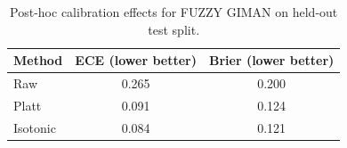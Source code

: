 \begin{table}[t]
\centering
\caption{Post-hoc calibration effects for FUZZY GIMAN on held-out test split.}
\label{tab:calibration}
\begin{tabular}{lcc}
\toprule
Method & ECE (lower better) & Brier (lower better) \\
\midrule
Raw & 0.265 & 0.200 \\
Platt & 0.091 & 0.124 \\
Isotonic & 0.084 & 0.121 \\
\bottomrule
\end{tabular}
\end{table}
